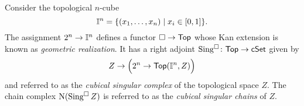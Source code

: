 Consider the topological $n$-cube
\begin{equation*}
\mathbb{I}^{n} = \{(x_1, \dots, x_n) \mid x_i \in [0,1]\}.
\end{equation*}
The assignment $2^n \to \mathbb{I}^n$ defines a functor $\square \to \mathsf{Top}$ whose Kan extension is known as \textit{geometric realization}.
It has a right adjoint $\operatorname{Sing^{\square}} \colon \mathsf{Top} \to \mathsf{cSet}$ given by
\begin{equation*}
Z \to \Big(2^n \to \mathsf{Top}(\mathbb{I}^n, Z)\Big)
\end{equation*}
and referred to as the \textit{cubical singular complex} of the topological space $Z$.
The chain complex $\operatorname{N}(\operatorname{Sing^{\square}} Z)$ is referred to as the \textit{cubical singular chains} of $Z$.


